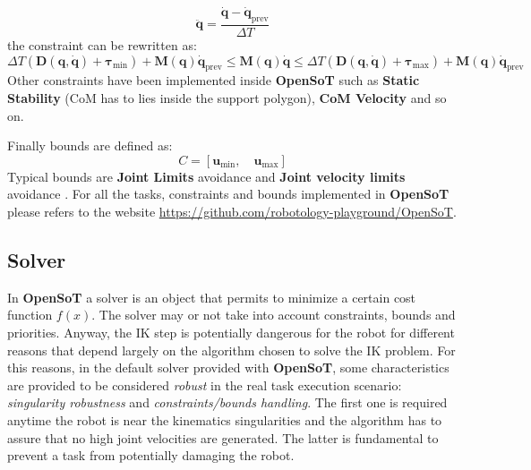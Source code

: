 \begin{equation}
\mathbf{\ddot{q}} = \frac{\mathbf{\dot{q}}-\mathbf{\dot{q}}_\text{prev}}{\Delta T}
\end{equation}
the constraint can be rewritten as:
\begin{equation}
\Delta T \left(\mathbf{D}(\mathbf{q}, \mathbf{\dot{q}}) + \boldsymbol{\tau}_\text{min}\right ) + \mathbf{M}(\mathbf{q})\mathbf{\dot{q}}_\text{prev} \leq
\mathbf{M}(\mathbf{q})\mathbf{\dot{q}} 
\leq  \Delta T \left(\mathbf{D}(\mathbf{q}, \mathbf{\dot{q}}) + \boldsymbol{\tau}_\text{max}\right)+ \mathbf{M}(\mathbf{q})\mathbf{\dot{q}}_\text{prev}
\label{robot_dynamics_constraint}
\end{equation}
Other constraints have been implemented inside \textbf{OpenSoT} such as \textbf{Static Stability} (CoM has to lies inside the support polygon), \textbf{CoM Velocity} and so on. 

Finally bounds are defined as:
\begin{equation}
    C = \left[ \mathbf{u}_\text{min}, \quad \mathbf{u}_\text{max} \right]
\end{equation}
Typical bounds are \textbf{Joint Limits} avoidance and \textbf{Joint velocity limits} avoidance \cite{RocchiMingoHoffman:15}. For all the tasks, constraints and bounds implemented in \textbf{OpenSoT} please refers to the website \url{https://github.com/robotology-playground/OpenSoT}.
 
\subsection{Solver}
In \textbf{OpenSoT} a solver is an object that permits to minimize a certain cost function $f(x)$. The solver may or not take into account constraints, bounds and priorities. Anyway, the IK step is potentially dangerous for the robot for different reasons that depend largely on the algorithm chosen to solve the IK problem.
For this reasons, in the default solver provided with \textbf{OpenSoT}, some characteristics are provided to be considered \emph{robust} in the real task execution scenario: \emph{singularity robustness} and \emph{constraints/bounds handling}.
The first one is required anytime the robot is near the kinematics singularities and the algorithm has to assure that no high joint velocities are generated.
The latter is fundamental to prevent a task from potentially damaging the robot. 

